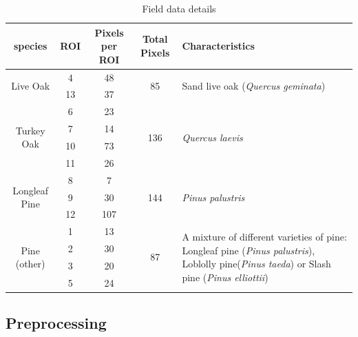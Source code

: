 \documentclass[remotesensing,article,accept,moreauthors,pdftex,12pt,a4paper]{mdpi}
\begin{document}
\begin{table}
\begin{center}

    \begin{tabular}{ | c | c | c | c | p{7cm} | }
    \hline
    species & ROI & Pixels per ROI & Total Pixels & Characteristics \\
    \hline
    \multirow{2}{*}{Live Oak} & 4  & 48 & \multirow{2}{*}{85} & \multirow{2}{*}{Sand live oak (\textit{Quercus geminata})} \\ 
 & 13 & 37 & & \\    
    \hline
    \multirow{4}{*}{Turkey Oak} & 6 & 23 &\multirow{4}{*}{136} & \multirow{4}{*}{\textit{Quercus laevis}} \\ 
     & 7 & 14 & & \\    
     & 10 & 73 &  & \\    
     & 11 & 26 & & \\    
    \hline
    \multirow{3}{*}{Longleaf Pine} & 8 & 7 & \multirow{3}{*}{144} & \multirow{3}{*}{\textit{Pinus palustris}} \\ 
     & 9 & 30 &  & \\    
     & 12 & 107 & & \\
     \hline
    \multirow{4}{*}{Pine (other)} & 1 & 13 & \multirow{4}{*}{87} & \multirow{4}{7cm}{A mixture of different varieties of pine:  Longleaf pine (\textit{Pinus palustris}), Loblolly pine(\textit{Pinus taeda}) or Slash pine (\textit{Pinus elliottii})} \\
     & 2 & 30 & & \\    
     & 3 & 20 & & \\    
     & 5 & 24 & & \\
    \hline
    
    \end{tabular}
    \caption{Field data details}
    \label{table:field data}
    \end{center}

\end{table}








\subsection{Preprocessing}
\end{document}
